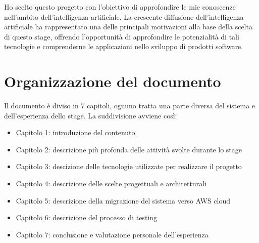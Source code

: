 Ho scelto questo progetto con l'obiettivo di approfondire le mie conoscenze nell'ambito dell'intelligenza artificiale.
La crescente diffusione dell'intelligenza artificiale ha rappresentato una delle principali motivazioni alla base della scelta di questo stage,
 offrendo l'opportunità di approfondire le potenzialità di tali tecnologie e comprenderne le applicazioni nello sviluppo di prodotti software.
\section{Organizzazione del documento}

Il documento è diviso in 7 capitoli, ognuno tratta una parte diversa del sistema e dell'esperienza dello stage.
La suddivisione avviene così:
\begin{itemize}
    \item Capitolo 1: introduzione del contenuto
    \item Capitolo 2: descrizione più profonda delle attività svolte durante lo stage
    \item Capitolo 3: descizione delle tecnologie utilizzate per realizzare il progetto
    \item Capitolo 4: descrizione delle scelte progettuali e architetturali
    \item Capitolo 5: descrizione della migrazione del sistema verso AWS cloud
    \item Capitolo 6: descrizione del processo di testing
    \item Capitolo 7: conclusione e valutazione personale dell'esperienza 
\end{itemize}


